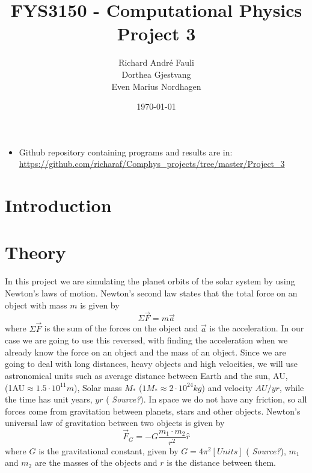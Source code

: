\documentclass[norsk,a4paper,12pt]{article}
\title{FYS3150 - Computational Physics\\\vspace{2mm} \Large{Project 3}}
\author{\large Richard Andr\'e Fauli\\ Dorthea Gjestvang\\ Even Marius Nordhagen}
\date{\today}
\begin{document}
\maketitle

\begin{abstract}
\end{abstract}
\begin{itemize}
\item Github repository containing programs and results are in: \url{https://github.com/richaraf/Comphys_projects/tree/master/Project_3}
\end{itemize}
\section{Introduction}
\section{Theory}
In this project we are simulating the planet orbits of the solar system by using Newton's laws of motion. Newton's second law states that the total force on an object with mass $m$ is given by
\begin{equation}
\Sigma\vec{F}=m\vec{a}
\label{eq:N2L}
\end{equation}
where $\Sigma \vec{F}$ is the sum of the forces on the object and $\vec{a}$ is the acceleration. In our case we are going to use this reversed, with finding the acceleration when we already know the force on an object and the mass of an object. Since we are going to deal with long distances, heavy objects and high velocities, we will use astronomical units such as average distance between Earth and the sun, AU, (1AU$\approx1.5\cdot10^{11}m$), Solar mass $M_*$ ($1M_*\approx2\cdot10^{24} kg$) and velocity $AU/yr$, while the time has unit years, $yr$ (\emph{\color{red} Source?}). In space we do not have any friction, so all forces come from gravitation between planets, stars and other objects. Newton's universal law of gravitation between two objects is given by
\begin{equation}
\vec{F}_G=-G\frac{m_1\cdot m_2}{r^2}\hat{r}
\label{eq:GravitationalForce}
\end{equation}
where $G$ is the gravitational constant, given by $G=4\pi^2[Units]$ (\emph{\color{red} Source?}), $m_1$ and $m_2$ are the masses of the objects and $r$ is the distance between them.
\end{document}
